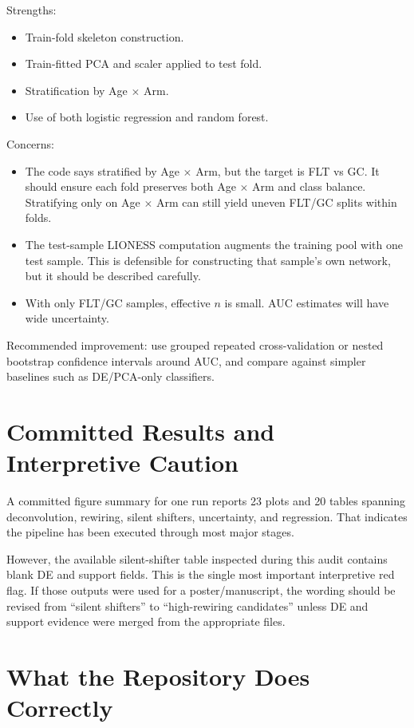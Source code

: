 \documentclass[11pt]{article}
\begin{document}
Strengths:
\begin{itemize}[leftmargin=1.5em]
    \item Train-fold skeleton construction.
    \item Train-fitted PCA and scaler applied to test fold.
    \item Stratification by Age $\times$ Arm.
    \item Use of both logistic regression and random forest.
\end{itemize}

Concerns:
\begin{itemize}[leftmargin=1.5em]
    \item The code says stratified by Age $\times$ Arm, but the target is FLT vs GC.  It should ensure each fold preserves both Age $\times$ Arm and class balance.  Stratifying only on Age $\times$ Arm can still yield uneven FLT/GC splits within folds.
    \item The test-sample LIONESS computation augments the training pool with one test sample.  This is defensible for constructing that sample's own network, but it should be described carefully.
    \item With only FLT/GC samples, effective $n$ is small.  AUC estimates will have wide uncertainty.
\end{itemize}

Recommended improvement: use grouped repeated cross-validation or nested bootstrap confidence intervals around AUC, and compare against simpler baselines such as DE/PCA-only classifiers.

\section{Committed Results and Interpretive Caution}

A committed figure summary for one run reports 23 plots and 20 tables spanning deconvolution, rewiring, silent shifters, uncertainty, and regression.  That indicates the pipeline has been executed through most major stages.

However, the available silent-shifter table inspected during this audit contains blank DE and support fields.  This is the single most important interpretive red flag.  If those outputs were used for a poster/manuscript, the wording should be revised from ``silent shifters'' to ``high-rewiring candidates'' unless DE and support evidence were merged from the appropriate files.

\section{What the Repository Does Correctly}
\end{document}
